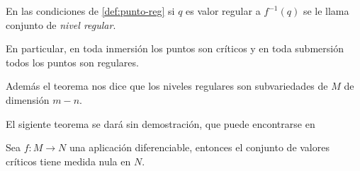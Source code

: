 \documentclass[../VD.tex]{subfiles}
\begin{document}
\begin{definition}
En las condiciones de \cref{def:punto-reg} si \(q\) es valor regular a \(f^{-1}(q)\) se le llama conjunto de \emph{nivel regular}.
\end{definition}

\begin{remark}
En particular, en toda inmersión los puntos son críticos y en toda submersión todos los puntos son regulares.

Además el teorema %
nos dice que los niveles regulares son subvariedades de \(M\) de dimensión \(m-n\).
\end{remark}

El sigiente teorema se dará sin demostración, que puede encontrarse en %

\begin{theorem}%
Sea \(f\colon M\to N\) una aplicación diferenciable, entonces el conjunto de valores críticos tiene medida nula en \(N\).
\end{theorem}
\end{document}
